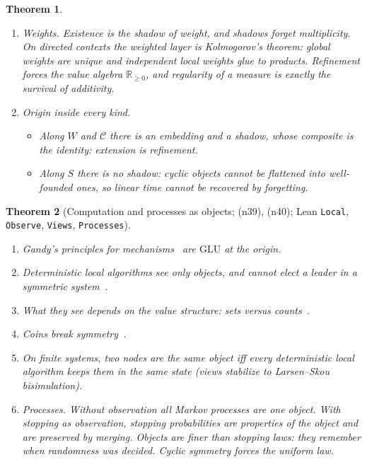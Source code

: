 \documentclass[11pt]{article}
\newtheorem{theorem}{Theorem}[section]
\theoremstyle{definition}
\theoremstyle{remark}
\newcommand{\GLU}{\mathrm{GLU}}
\newcommand{\R}{\mathbb{R}}
\newcommand{\lean}[1]{\texttt{#1}}
\newcommand{\note}[1]{\textsf{(n#1)}}
\begin{document}
\begin{theorem}
\begin{enumerate}
\item \emph{Weights.} Existence is the shadow of weight, and shadows forget multiplicity. On directed contexts the weighted layer is Kolmogorov's theorem: global weights are unique and independent local weights glue to products. Refinement forces the value algebra $\R_{\ge0}$, and regularity of a measure is exactly the survival of additivity.
\item \emph{Origin inside every kind.}
  \begin{itemize}
  \item Along $W$ and $\mathcal C$ there is an embedding and a shadow, whose composite is the identity: extension is refinement.
  \item Along $S$ there is no shadow: cyclic objects cannot be flattened into well-founded ones, so linear time cannot be recovered by forgetting.
  \end{itemize}
\end{enumerate}
\end{theorem}

\begin{theorem}[Computation and processes as objects; \note{39}, \note{40}; Lean \lean{Local}, \lean{Observe}, \lean{Views}, \lean{Processes}]
\leavevmode
\begin{enumerate}
\item Gandy's principles for mechanisms~\cite{Gandy80} are $\GLU$ at the origin.
\item Deterministic local algorithms see only objects, and cannot elect a leader in a symmetric system~\cite{Angluin80,YamashitaKameda96}.
\item What they see depends on the value structure: sets versus counts~\cite{Hella15}.
\item Coins break symmetry~\cite{ItaiRodeh90}.
\item On finite systems, two nodes are the same object iff every deterministic local algorithm keeps them in the same state (views stabilize to Larsen--Skou bisimulation).
\item \emph{Processes.} Without observation all Markov processes are one object. With stopping as observation, stopping probabilities are properties of the object and are preserved by merging. Objects are finer than stopping laws: they remember when randomness was decided. Cyclic symmetry forces the uniform law.
\end{enumerate}
\end{theorem}

\end{document}
